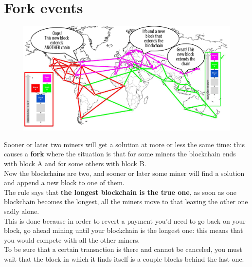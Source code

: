     \section{Fork events}
        \begin{figure}[ht!]
            \centering
            \includegraphics[width=0.6\linewidth]{fork.png}
        \end{figure}
        Sooner or later two miners will get a solution at more or less the same time: this causes a \textbf{fork} where the situation is that for some miners the blockchain ends with block A and for some others with block B.\\
        Now the blockchains are two, and sooner or later some miner will find a solution and append a new block to one of them.\\ 
        The rule says that \textbf{the longest blockchain is the true one}, as soon as one blockchain becomes the longest, all the miners move to that leaving the other one sadly alone.\\
        This is done because in order to revert a payment you'd need to go back on your block, go ahead mining until your blockchain is the longest one: this means that you would compete with all the other miners.\\ 
        To be sure that a certain transaction is there and cannot be canceled, you must wait that the block in which it finds itself is a couple blocks behind the last one.    
